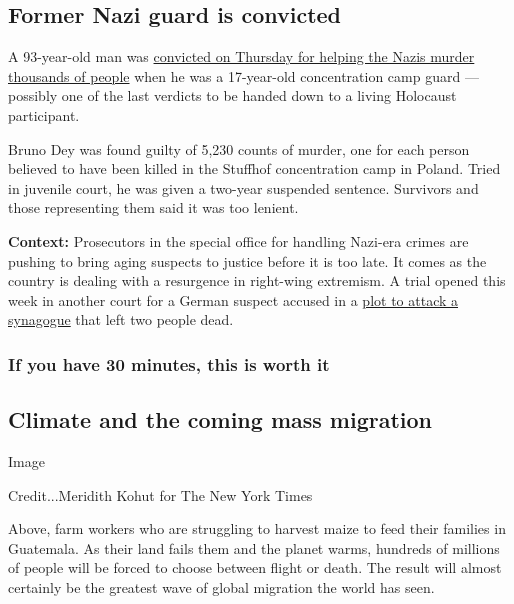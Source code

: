 \hypertarget{former-nazi-guard-is-convicted}{%
\subsection{Former Nazi guard is
convicted}\label{former-nazi-guard-is-convicted}}

A 93-year-old man was
\href{https://www.nytimes.com/2020/07/23/world/europe/holocaust-trial-nazi-guard-germany.html}{convicted
on Thursday for helping the Nazis murder thousands of people} when he
was a 17-year-old concentration camp guard --- possibly one of the last
verdicts to be handed down to a living Holocaust participant.

Bruno Dey was found guilty of 5,230 counts of murder, one for each
person believed to have been killed in the Stuffhof concentration camp
in Poland. Tried in juvenile court, he was given a two-year suspended
sentence. Survivors and those representing them said it was too lenient.

\textbf{Context:} Prosecutors in the special office for handling
Nazi-era crimes are pushing to bring aging suspects to justice before it
is too late. It comes as the country is dealing with a resurgence in
right-wing extremism. A trial opened this week in another court for a
German suspect accused in a
\href{https://www.nytimes.com/2020/07/21/world/europe/germany-synagogue-attack-trial.html}{plot
to attack a synagogue} that left two people dead.

\hypertarget{if-you-have-30-minutes-this-is-worth-it}{%
\subsubsection{If you have 30 minutes, this is worth
it}\label{if-you-have-30-minutes-this-is-worth-it}}

\hypertarget{climate-and-the-coming-mass-migration}{%
\subsection{Climate and the coming mass
migration}\label{climate-and-the-coming-mass-migration}}

Image

Credit...Meridith Kohut for The New York Times

Above, farm workers who are struggling to harvest maize to feed their
families in Guatemala. As their land fails them and the planet warms,
hundreds of millions of people will be forced to choose between flight
or death. The result will almost certainly be the greatest wave of
global migration the world has seen.

